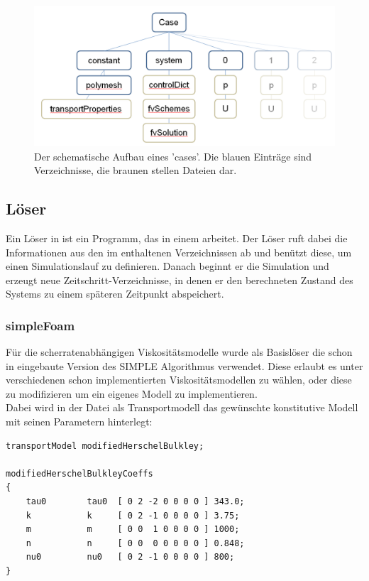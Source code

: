 \begin{figure}
    \centering
    \includegraphics[width=\textwidth]{figures/OfCaseSchema.png}
    \caption{Der schematische Aufbau eines \openfoam{} 'cases'. Die blauen Einträge sind Verzeichnisse, die braunen stellen Dateien dar.}
    \label{fig:ofCaseSchema}
\end{figure}
%
\subsection{Löser}
Ein Löser in \openfoam{} ist ein \cpp{} Programm, das in einem  arbeitet. Der Löser ruft dabei die Informationen aus den im  enthaltenen Verzeichnissen ab und benützt diese, um einen Simulationslauf zu definieren. Danach beginnt er die Simulation und erzeugt neue Zeitschritt-Verzeichnisse, in denen er den berechneten Zustand des Systems zu einem späteren Zeitpunkt abspeichert.

\subsubsection{simpleFoam}
Für die scherratenabhängigen Viskositätsmodelle wurde als Basislöser die schon in \openfoam{} eingebaute Version  des SIMPLE Algorithmus verwendet.
Diese erlaubt es unter verschiedenen schon implementierten Viskositätsmodellen zu wählen, oder diese zu modifizieren um ein eigenes Modell zu implementieren.\\
Dabei wird in der Datei  als Transportmodell das gewünschte konstitutive Modell mit seinen Parametern hinterlegt:
%
\begin{lstlisting}
transportModel modifiedHerschelBulkley;

modifiedHerschelBulkleyCoeffs
{
    tau0        tau0  [ 0 2 -2 0 0 0 0 ] 343.0;
    k           k     [ 0 2 -1 0 0 0 0 ] 3.75;
    m           m     [ 0 0  1 0 0 0 0 ] 1000;
    n           n     [ 0 0  0 0 0 0 0 ] 0.848;
    nu0         nu0   [ 0 2 -1 0 0 0 0 ] 800;
}
\end{lstlisting}
%
